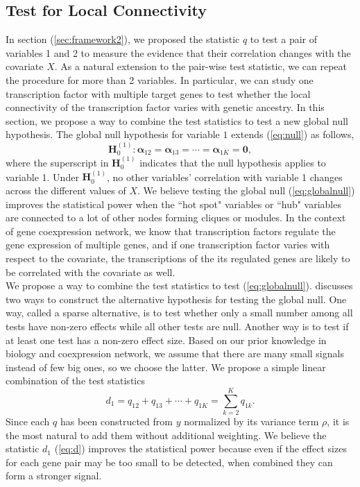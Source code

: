 \documentclass[aap,authoryear, preprint]{imsart}
\numberwithin{equation}{section}
\theoremstyle{plain}
\begin{document}
\subsection{Test for Local Connectivity \label{sec:frameworkK}} 
In section (\ref{sec:framework2}), we proposed the statistic $q$ to test a pair of variables 1 and 2 to measure the evidence that their correlation changes with the covariate $X$. As a natural extension to the pair-wise test statistic, we can repeat the procedure for more than 2 variables. In particular, we can study one transcription factor with  multiple target genes to test whether the local connectivity of the transcription factor varies with genetic ancestry. In this section, we propose a way to combine the test statistics to test a new global null hypothesis. The global null hypothesis for variable $1$ extends (\ref{eq:null}) as follows,
\begin{equation}
    \bm{H}_0^{(1)}: \bm{\alpha}_{12} = \bm{\alpha}_{13} = \cdots = \bm{\alpha}_{1K} = \bm{0},
\label{eq:globalnull}
\end{equation}
where the superscript in $\bm{H}_0^{(1)}$ indicates that the null hypothesis applies to variable 1. Under $\bm{H}_0^{(1)}$, no other variables' correlation with variable 1 changes across the different values of  $X$. We believe testing the global null (\ref{eq:globalnull}) improves the statistical power when the ``hot spot" variables or ``hub" variables are connected to a lot of other nodes forming cliques or modules. In the context of gene coexpression network, we know that transcription factors regulate the gene expression of multiple genes, and if one transcription factor varies with respect to the covariate, the transcriptions of the its regulated genes are likely to be correlated with the covariate as well. \\

We propose a way to combine the test statistics to test (\ref{eq:globalnull}). \cite{chen2012exponential} discusses two ways to construct the alternative hypothesis for testing the global null. One way, called a sparse alternative, is to test whether only a small number among all tests have non-zero effects while all other tests are null. Another way is to test if at least one test has a non-zero effect size. Based on our prior knowledge in biology and coexpression network, we assume that there are many small signals instead of few big ones, so we choose the latter. We propose a simple linear combination of the test statistics
\begin{equation}
d_1 = {q}_{12} + {q}_{13} + \cdots + {q}_{1K} = \sum_{k=2}^{K} {q}_{1k}.
\label{eq:d}
\end{equation}
Since each $q$ has been constructed from $y$ normalized by its variance term $\rho$, it is the most natural to add them without additional weighting. We believe the statistic $d_1$ (\ref{eq:d}) improves the statistical power because even if the effect sizes for each gene pair may be too small to be detected, when combined they can form a stronger signal. \\
\end{document}
